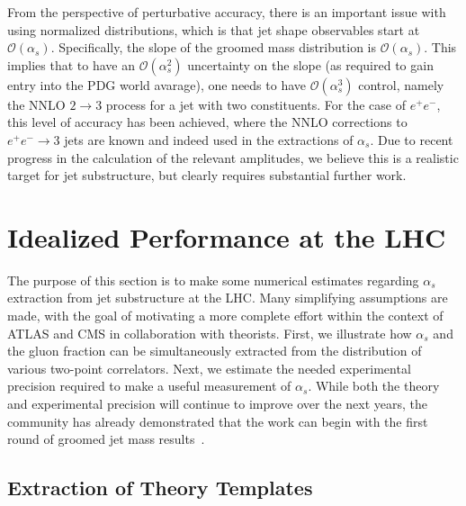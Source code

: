\documentclass[11pt]{cernrep}
\begin{document}

From the perspective of perturbative accuracy, there is an important issue with using normalized distributions, which is that jet shape observables start at $\mathcal{O}(\alpha_s)$.
%
Specifically, the slope of the groomed mass distribution is $\mathcal{O}(\alpha_s)$.
%
This implies that to have an $\mathcal{O}(\alpha_s^2)$ uncertainty on the slope (as required to gain entry into the PDG world avarage), one needs to have $\mathcal{O}(\alpha_s^3)$ control, namely the NNLO $2 \to 3$ process for a jet with two constituents.
%
For the case of $e^+e^-$, this level of accuracy has been achieved, where the NNLO corrections to $e^+e^-\to 3$ jets are known and indeed used in the extractions of $\alpha_s$.
%
Due to recent progress in the calculation of the relevant amplitudes, we believe this is a realistic target for jet substructure, but clearly requires substantial further work.

\section{Idealized Performance at the LHC}
\label{jetsub_alphas_sec:ben_study}

The purpose of this section is to make some numerical estimates regarding $\alpha_s$ extraction from jet substructure at the LHC.
%
Many simplifying assumptions are made, with the goal of motivating a more complete effort within the context of ATLAS and CMS in collaboration with theorists.
%
First, we illustrate how $\alpha_s$ and the gluon fraction can be simultaneously extracted from the distribution of various two-point correlators.
%
Next, we estimate the needed experimental precision required to make a useful measurement of $\alpha_s$.
%
While both the theory and experimental precision will continue to improve over the next years, the community has already demonstrated that the work can begin with the first round of groomed jet mass results~\cite{Aaboud:2017qwh,CMS-PAS-SMP-16-010,Frye:2016aiz,Frye:2016okc,Marzani:2017mva,Marzani:2017kqd}.

\subsection{Extraction of Theory Templates}
\label{jetsub_alphas_sec:templates}
\end{document}
